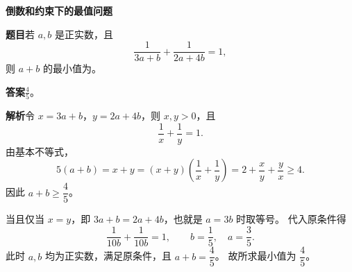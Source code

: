 \documentclass[UTF8,a4paper,12pt,fontset=none]{ctexart}
\begin{document}
\begin{center}
  {\Large\bfseries 倒数和约束下的最值问题}
\end{center}
\medskip
\textbf{题目}\quad 若 $a,b$ 是正实数，且
\[
  \frac{1}{3a+b}+\frac{1}{2a+4b}=1,
\]
则 $a+b$ 的最小值为\underline{\hspace{2cm}}。

\bigskip
\textbf{答案}\quad $\displaystyle\boxed{\frac45}$。

\bigskip
\textbf{解析}\quad 令 $x=3a+b$，$y=2a+4b$，则 $x,y>0$，且
\[
  \frac1x+\frac1y=1.
\]
由基本不等式，
\[
  5(a+b)=x+y
  =(x+y)\left(\frac1x+\frac1y\right)
  =2+\frac{x}{y}+\frac{y}{x}
  \ge 4.
\]
因此 $a+b\ge\dfrac45$。

当且仅当 $x=y$，即 $3a+b=2a+4b$，也就是 $a=3b$ 时取等号。
代入原条件得
\[
  \frac{1}{10b}+\frac{1}{10b}=1,
  \qquad b=\frac15,\quad a=\frac35.
\]
此时 $a,b$ 均为正实数，满足原条件，且 $a+b=\dfrac45$。
故所求最小值为 $\boxed{\dfrac45}$。
\end{document}
